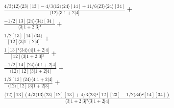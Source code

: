 \documentclass[varwidth, border=5pt]{standalone}
\begin{document}
\begin{my}
$\begin{gathered}
\scriptscriptstyle\frac{4/3⟨12⟩⟨23⟩[13]-4/3⟨12⟩⟨24⟩[14]+11/6⟨23⟩⟨24⟩[34]}{⟨12⟩⟨3|1+2|4]} +\\
\scriptscriptstyle\frac{-1/2[13]⟨24⟩⟨34⟩[34]}{⟨3|1+2|3]²} +\\
\scriptscriptstyle\frac{1/2[13][14]⟨34⟩}{[12]⟨3|1+2|4]} +\\
\scriptscriptstyle\frac{1[13]²⟨34⟩⟨4|1+2|4]}{[12]⟨3|1+2|3]²} +\\
\scriptscriptstyle\frac{-1/2[14]⟨24⟩⟨4|1+2|4]}{⟨12⟩[12]⟨3|1+2|4]} +\\
\scriptscriptstyle\frac{1/2[13]⟨24⟩⟨4|1+2|4]}{⟨12⟩[12]⟨3|1+2|3]} +\\
\scriptscriptstyle\frac{⟨12⟩[13](4/3⟨13⟩⟨23⟩[12][13]+4/3⟨23⟩²[12][23]-1/2⟨34⟩²[14][34])}{⟨3|1+2|3]²⟨3|1+2|4]} \phantom{+}
\end{gathered}$
\end{my}
\end{document}
